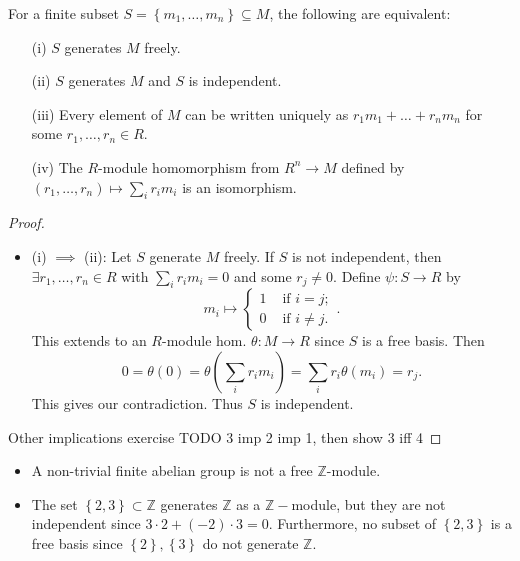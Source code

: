\documentclass[egregdoesnotlikesansseriftitles,a4paper]{scrartcl}
\begin{document}
\begin{proposition}
       For a finite subset $S= \left\{m_1 , \ldots, m_n\right\} \subseteq M$, the following are equivalent:
       \begin{itemize}
             \item[(i)] $S$ generates $M$ freely.
             \item[(ii)] $S$ generates $M$ and $S$ is independent.
             \item[(iii)] Every element of $M$ can be written uniquely as $r_1 m_1 +\ldots+r_n m_n$ for some $r_1 ,\ldots,r_n \in R$.
             \item[(iv)] The $R$-module homomorphism from $R^{n}\rightarrow M$ defined by $(r_1 ,\ldots, r_n )\mapsto  \sum_{i}^{}r_{i}m_{i}$ is an isomorphism.
       \end{itemize}
       \begin{proof}
               \begin{itemize}
                      \item (i) $\implies $ (ii): Let $S$ generate $M$ freely. If $S$ is not independent, then $\exists r_1 , \ldots, r_n \in R$ with $\sum_{i}^{}r_{i}m_{i}=0$ and some $r_j \neq 0$. Define $\psi: S \rightarrow R$ by \[
                      m_{i} \mapsto \begin{cases}
                             1 &\text{ if } i=j ;\\
                             0 &\text{ if } i \neq j .
                      \end{cases}
                      .\] This extends to an $R$-module hom. $\theta: M \rightarrow R$ since $S$ is a free basis. Then \[
                      0= \theta (0)= \theta (\sum_{i}^{}r_{i}m_{i})= \sum_{i}^{}r_{i}\theta (m_{i})= r_{j}
                      .\] This gives our contradiction. Thus $S$ is independent.
               \end{itemize}
               Other implications exercise TODO 3 imp 2 imp 1, then show 3 iff 4
       \end{proof}
\end{proposition}
\begin{example*}
         \begin{itemize}
                \item A non-trivial finite abelian group is not a free $\mathbb{Z}$-module.
                \item The set $\left\{2,3\right\} \subset \mathbb{Z}$ generates $\mathbb{Z}$ as a $\mathbb{Z}-$module, but they are not independent since $3 \cdot 2 + (-2)\cdot 3=0$. Furthermore, no subset of $\left\{2,3\right\}$ is a free basis since $\left\{2\right\}, \left\{3\right\}$ do not generate $\mathbb{Z}$.
         \end{itemize}
\end{example*}
\end{document}

